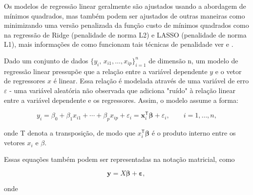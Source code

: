 Os modelos de regressão linear geralmente são ajustados usando a abordagem de mínimos quadrados, mas também podem ser ajustados de outras maneiras como minimizando uma versão penalizada da função custo de mínimos quadrados como na regressão de Ridge (penalidade de norma L2) e LASSO (penalidade de norma L1), mais informações de como funcionam tais técnicas de penalidade ver \citet{SantosaAndSymes1986} e \citet{Tibshirani1996}.

Dado um conjunto de dados $ {\displaystyle \{y_{i},\,x_{i1},\ldots ,x_{ip}\}_{i=1}^{n}} $ de dimensão n, um modelo de regressão linear pressupõe que a relação entre a variável dependente $ y $ e o vetor de regressores $ x $ é linear. Essa relação é modelada através de uma variável de erro $ \varepsilon $ - uma variável aleatória não observada que adiciona "ruído" à relação linear entre a variável dependente e os regressores. Assim, o modelo assume a forma:

\begin{equation}
{\displaystyle y_{i}=\beta _{0}+\beta _{1}x_{i1}+\cdots +\beta _{p}x_{ip}+\varepsilon _{i}=\mathbf {x} _{i}^{\mathsf {T}}{\boldsymbol {\beta }}+\varepsilon _{i},\qquad i=1,\ldots ,n,}
\end{equation}

onde T denota a transposição, de modo que $ {x}_{i}^{\mathsf {T}}{\boldsymbol {\beta }} $ é o produto interno entre os vetores $ {x}_{i} $ e $ \beta $.

Essas equações também podem ser representadas na notação matricial, como

\begin{equation}
{\displaystyle \mathbf {y} =X{\boldsymbol {\beta }}+{\boldsymbol {\varepsilon }},\,}
\end{equation}

onde

